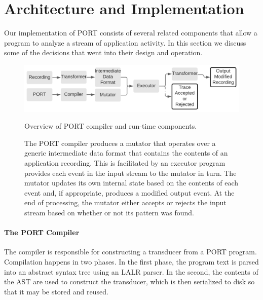 \section{Architecture and Implementation}

Our implementation of PORT consists of several related
components that allow a program to analyze a stream of
application activity.
In this section we discuss some
of the decisions that went into their design and operation.
\label{SEC:architecture}

\begin{figure}
\centering
  \includegraphics[scale=.8]{chapter5/images/architecture}
  \caption{Overview of PORT compiler and run-time components.}
   \caption{The PORT compiler produces a mutator that operates over a
   generic intermediate data format that contains the contents of an application
   recording.  This is facilitated by an executor program provides each
   event in the input stream to the mutator in turn.  The mutator updates
   its own internal state based on the contents of each event and, if
   appropriate, produces a modified output event.  At the end of processing,
   the mutator either accepts or rejects the input stream based on whether
   or not its pattern was found.}
  \label{fig:architecture}
\end{figure}

\paragraph{The PORT Compiler}
The compiler is responsible for constructing a transducer
from a PORT program.
Compilation happens in two phases.  In the first phase, the program text is
parsed into an abstract syntax tree using an LALR parser.
In the second, the
contents of the AST are used to construct the transducer, which is then serialized to
disk so that it may be stored and reused.

